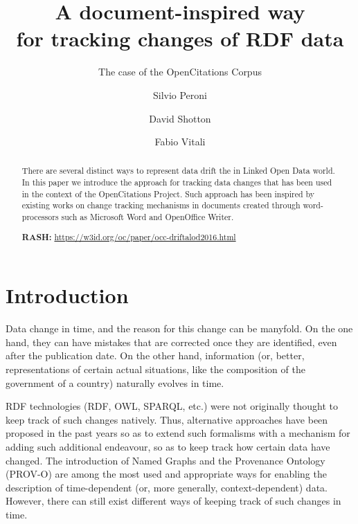 \documentclass[runningheads,a4paper]{llncs}
\begin{document}
\mainmatter

\title{A document-inspired way\\ for tracking changes of RDF data}
\subtitle{The case of the OpenCitations Corpus}
\author{Silvio Peroni \and
David Shotton \and
Fabio Vitali}
\maketitle

\begin{abstract}
There are several distinct ways to represent data drift the in Linked Open Data world. In this paper we introduce the approach for tracking data changes that has been used in the context of the OpenCitations Project. Such approach has been inspired by existing works on change tracking mechanisms in documents created through word-processors such as Microsoft Word and OpenOffice Writer.

{\bf RASH:} \url{https://w3id.org/oc/paper/occ-driftalod2016.html}

\end{abstract}


\section{Introduction}

Data change in time, and the reason for this change can be manyfold. On the one hand, they can have mistakes that are corrected once they are identified, even after the publication date. On the other hand, information (or, better, representations of certain actual situations, like the composition of the government of a country) naturally evolves in time.

RDF technologies (RDF, OWL, SPARQL, etc.) were not originally thought to keep track of such changes natively. Thus, alternative approaches have been proposed in the past years so as to extend such formalisms with a mechanism for adding such additional endeavour, so as to keep track how certain data have changed. The introduction of Named Graphs  \cite{__RefNumPara__17367_1591320820} and the Provenance Ontology (PROV-O)  \cite{__RefNumPara__17349_1591320820} are among the most used and appropriate ways for enabling the description of time-dependent (or, more generally, context-dependent) data. However, there can still exist different ways of keeping track of such changes in time.
\end{document}
